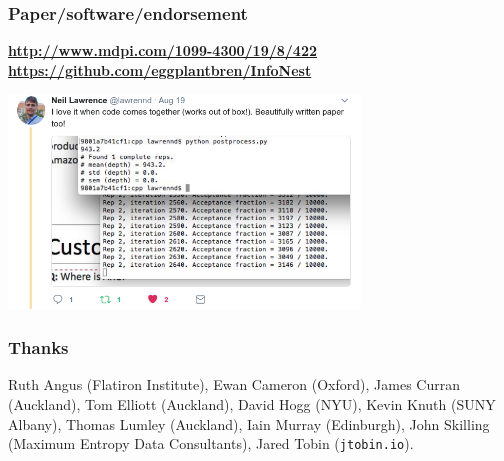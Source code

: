 \documentclass{beamer}
\begin{document}
\begin{frame}
\frametitle{Paper/software/endorsement}

{\color{blue}\bf \url{http://www.mdpi.com/1099-4300/19/8/422}
\url{https://github.com/eggplantbren/InfoNest}}
\vspace{0.5cm}

\begin{center}
\includegraphics[width=0.7\textwidth]{lawrence.png}
\end{center}

\end{frame}



\begin{frame}
\frametitle{Thanks}


Ruth Angus (Flatiron Institute),
Ewan Cameron (Oxford), James Curran (Auckland), Tom Elliott (Auckland),
David Hogg (NYU), Kevin Knuth (SUNY Albany),
Thomas Lumley (Auckland),
Iain Murray (Edinburgh), John Skilling
(Maximum Entropy Data Consultants), Jared Tobin ({\tt jtobin.io}).


\end{frame}












\end{document}
